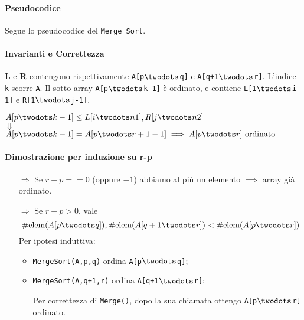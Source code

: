\paragraph{Pseudocodice} Segue lo pseudocodice del 
\texttt{Merge Sort}.





\paragraph{Invarianti e Correttezza}

\textbf{L} e \textbf{R} contengono rispettivamente 
\texttt{A[p$\twodots$q]} e \texttt{A[q+1$\twodots$r]}. 
L'indice \texttt{k} scorre \texttt{A}. Il sotto-array \texttt{A[p$\twodots$k-1]}
è ordinato, e contiene \texttt{L[1$\twodots$i-1]} e \texttt{R[1$\twodots$j-1]}.

\begin{center}
    $A[p \twodots k-1] \leq L[i \twodots n1], R[j \twodots n2]$ \\
    $\Downarrow$ \\
    $A[p \twodots k-1] = A[p \twodots r+1-1] \implies A[p \twodots r] \text{ ordinato}$
\end{center}

\paragraph{Dimostrazione per induzione su r-p} 
\begin{itemize}
    \item[$\Rightarrow$] Se $r-p == 0 $ (oppure $-1$) abbiamo al
    più un elemento $\implies$ array già ordinato.
    \item[$\Rightarrow$] Se $r-p > 0$, vale 
    $$\#\text{elem}(A[p \twodots q]),\#\text{elem}(A[q+1 \twodots r]) 
    < \#\text{elem}(A[p \twodots r])$$
    Per ipotesi induttiva:
    \begin{itemize}
        \item \texttt{MergeSort(A,p,q)} ordina \texttt{A[p$\twodots$q]};
        \item \texttt{MergeSort(A,q+1,r)} ordina \texttt{A[q+1$\twodots$r]}; \par
        Per correttezza di \texttt{Merge()}, dopo la sua chiamata ottengo 
        \texttt{A[p$\twodots$r]} ordinato.
    \end{itemize}
\end{itemize} 